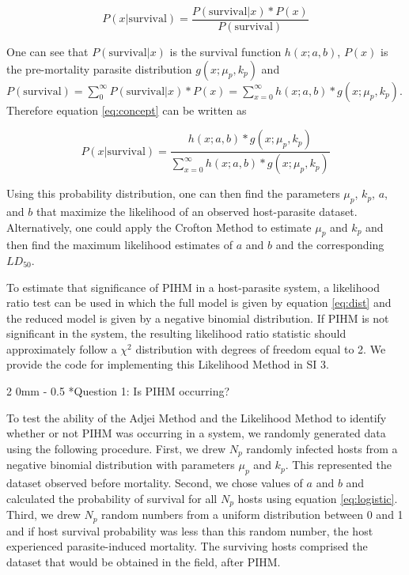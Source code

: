 \documentclass[12pt, a4paper]{article}
\makeatletter
\renewcommand{\subsection}{\@startsection
{subsection}%
{2}%
{0mm}%
{-\baselineskip}%
{0.5\baselineskip}%
{\normalfont\bf}} %
\makeatother
\begin{document}
\begin{equation}
    P(x | \text{survival}) = \dfrac{P(\text{survival} | x) * P(x)}{P(\text{survival})}
    \label{eq:concept}
\end{equation}

One can see that $P(\text{survival} | x)$ is the survival function $h(x; a, b)$, $P(x)$ is the pre-mortality parasite distribution $g(x; \mu_p, k_p)$ and $P(\text{survival}) = \sum_0^{\infty} P(\text{survival} | x) * P(x) =  \sum_{x=0}^{\infty} h(x; a, b)  * g(x; \mu_p, k_p)$. Therefore equation \ref{eq:concept} can be written as

\begin{equation}
    P(x | \text{survival}) = \dfrac{h(x; a, b)  * g(x; \mu_p, k_p)}{\sum_{x=0}^{\infty} h(x; a, b)  * g(x; \mu_p, k_p)}
    \label{eq:dist}
\end{equation}

Using this probability distribution, one can then find the parameters $\mu_p$, $k_p$, $a$, and $b$ that maximize the likelihood of an observed host-parasite dataset. Alternatively, one could apply the Crofton Method to estimate $\mu_p$ and $k_p$ and then find the maximum likelihood estimates of $a$ and $b$ and the corresponding $LD_{50}$.

To estimate that significance of PIHM in a host-parasite system, a
likelihood ratio test can be used in which the full model is given by equation
\ref{eq:dist} and the reduced model is given by a negative binomial
distribution.  If PIHM is not significant in the system, the resulting likelihood
ratio statistic should approximately follow a $\chi^2$ distribution with degrees of freedom equal to 2.  We provide the code for implementing this Likelihood Method in SI 3.

\subsection*{Question 1: Is PIHM occurring?}

To test the ability of the Adjei Method and the Likelihood Method to identify whether or not PIHM was occurring in a system, we randomly generated data using the following procedure.  First, we drew $N_p$ randomly infected hosts from a
negative binomial distribution with parameters $\mu_p$ and $k_p$.  This represented the dataset observed before mortality. Second, we chose values of $a$ and $b$ and calculated the probability of survival
for all $N_p$ hosts using equation \ref{eq:logistic}.  Third, we drew $N_p$ random numbers from a uniform distribution
between 0 and 1 and if host survival probability was less than this random
number, the host experienced parasite-induced mortality.  The surviving
hosts comprised the dataset that would be obtained in the field, after PIHM.
\end{document}
